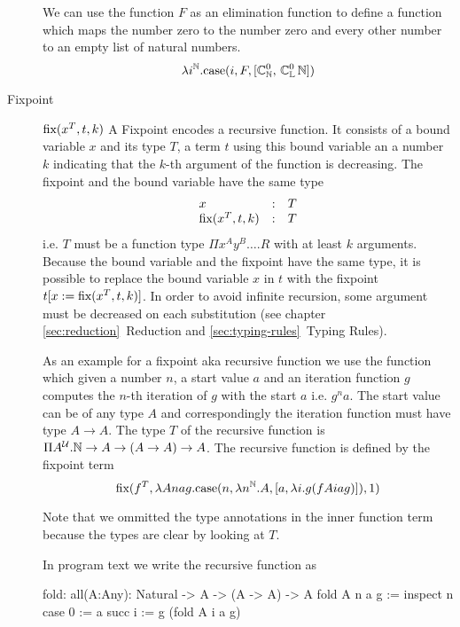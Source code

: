 \begin{description}
{    We can use the function $F$ as an elimination function to define a
    function which maps the number zero to the number zero and every other
    number to an empty list of natural numbers.
    $$
    \lambda i^\Nat.
    \case(i, F, [\Constructor^0_\Nat,\, \Constructor^0_\List\, \Nat])
    $$
  }
\item[Fixpoint] $\text{fix}(x^T, t, k)$ A Fixpoint encodes a recursive function. It
  consists of a bound variable $x$ and its type $T$, a term $t$ using this
  bound variable an a number $k$ indicating that the $k$-th argument of the
  function is decreasing. The fixpoint and the bound variable have the same
  type
  $$
  \begin{array}{lll}
    x &:& T
    \\
    \text{fix}(x^T, t, k) &:& T
  \end{array}
  $$
  i.e. $T$ must be a function type $\Pi x^A y^B \ldots . R$ with at least $k$
  arguments. Because the bound variable and the fixpoint have the same type,
  it is possible to replace the bound variable $x$ in $t$ with the fixpoint
  $t[x := \text{fix}(x^T, t, k)]$. In order to avoid infinite recursion, some
  argument must be decreased on each substitution (see chapter
  \ref{sec:reduction}~Reduction and \ref{sec:typing-rules}~Typing Rules).

  { \def\Nat{\mathbb{N}}

    As an example for a fixpoint aka recursive function we use the function
    which given a number $n$, a start value $a$ and an iteration function $g$
    computes the $n$-th iteration of $g$ with the start $a$ i.e. $g^n a$. The
    start value can be of any type $A$ and correspondingly the iteration
    function must have type $A \to A$. The type $T$ of the recursive function
    is $\Pi A^\Any. \Nat \to A \to (A \to A) \to A$. The recursive function is
    defined by the fixpoint term
    $$
    \fix (
    f^T,
    \lambda A n a g.
      \case(n,
            \lambda n^\Nat. A,
            [a, \lambda i. g (f A i a g)]
      ),
      1)
    $$
  }%
  Note that we ommitted the type annotations in the inner function term
  because the types are clear by looking at $T$.

  In program text we write the recursive function as
  \begin{alba}
    fold: all(A:Any): Natural -> A -> (A -> A) -> A
    fold A n a g :=
       inspect n case
          0 := a
          succ i := g (fold A i a g)
  \end{alba}
\end{description}






